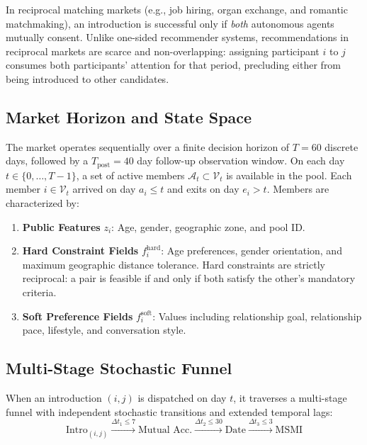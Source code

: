 \documentclass[10pt,twocolumn,letterpaper]{article}
\begin{document}
In reciprocal matching markets (e.g., job hiring, organ exchange, and romantic matchmaking), an introduction is successful only if \textit{both} autonomous agents mutually consent. Unlike one-sided recommender systems, recommendations in reciprocal markets are scarce and non-overlapping: assigning participant $i$ to $j$ consumes both participants' attention for that period, precluding either from being introduced to other candidates.

\subsection{Market Horizon and State Space}
The market operates sequentially over a finite decision horizon of $T = 60$ discrete days, followed by a $T_{\text{post}} = 40$ day follow-up observation window. On each day $t \in \{0, \dots, T-1\}$, a set of active members $\mathcal{A}_t \subset \mathcal{V}_t$ is available in the pool. Each member $i \in \mathcal{V}_t$ arrived on day $a_i \le t$ and exits on day $e_i > t$. Members are characterized by:
\begin{enumerate}[leftmargin=*]
    \item \textbf{Public Features} $z_i$: Age, gender, geographic zone, and pool ID.
    \item \textbf{Hard Constraint Fields} $f_i^{\text{hard}}$: Age preferences, gender orientation, and maximum geographic distance tolerance. Hard constraints are strictly reciprocal: a pair is feasible if and only if both satisfy the other's mandatory criteria.
    \item \textbf{Soft Preference Fields} $f_i^{\text{soft}}$: Values including relationship goal, relationship pace, lifestyle, and conversation style.
\end{enumerate}

\subsection{Multi-Stage Stochastic Funnel}
When an introduction $(i, j)$ is dispatched on day $t$, it traverses a multi-stage funnel with independent stochastic transitions and extended temporal lags:
\begin{equation}
\label{eq:funnel}
\text{Intro}_{(i, j)} \xrightarrow{\Delta t_1 \le 7} \text{Mutual Acc.} \xrightarrow{\Delta t_2 \le 30} \text{Date} \xrightarrow{\Delta t_3 \le 3} \text{MSMI}
\end{equation}
\end{document}
